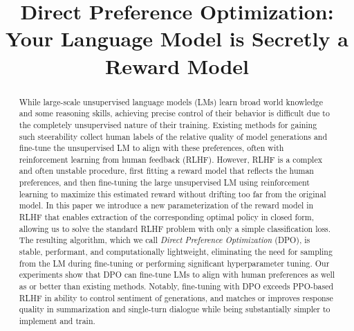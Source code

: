 \title{Direct Preference Optimization: Your Language Model is Secretly a Reward Model}

\begin{abstract}
While large-scale unsupervised language models (LMs) learn broad world knowledge and some reasoning skills, achieving precise control of their behavior is difficult due to the completely unsupervised nature of their training. Existing methods for gaining such steerability collect human labels of the relative quality of model generations and fine-tune the unsupervised LM to align with these preferences, often with reinforcement learning from human feedback (RLHF). However, RLHF is a complex and often unstable procedure, first fitting a reward model that reflects the human preferences, and then fine-tuning the large unsupervised LM using reinforcement learning to maximize this estimated reward without drifting too far from the original model. In this paper we introduce a new parameterization of the reward model in RLHF that enables extraction of the corresponding optimal policy in closed form, allowing us to solve the standard RLHF problem with only a simple classification loss. The resulting algorithm, which we call \textit{Direct Preference Optimization} (DPO), is stable, performant, and computationally lightweight, eliminating the need for  sampling from the LM during fine-tuning or performing significant hyperparameter tuning. Our experiments show that DPO can fine-tune LMs to align with human preferences as well as or better than existing methods. Notably, fine-tuning with DPO exceeds PPO-based RLHF in ability to control sentiment of generations, and matches or improves response quality in summarization and single-turn dialogue while being substantially simpler to implement and train.
\end{abstract}

